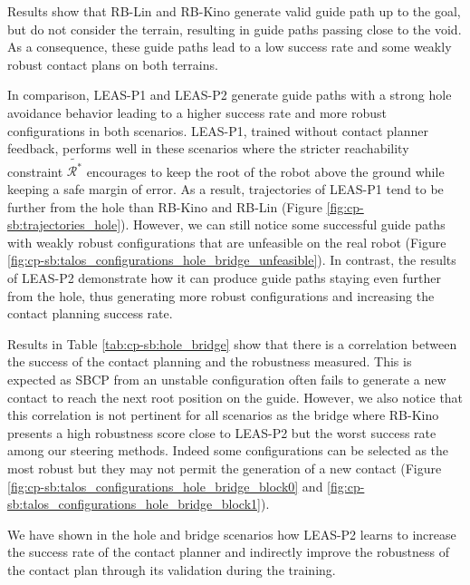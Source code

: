 Results show that RB-Lin and RB-Kino generate valid guide path up to the goal, but do not consider the terrain, resulting in guide paths passing close to the void. As a consequence, these guide paths lead to a low success rate and some weakly robust contact plans on both terrains.

In comparison, LEAS-P1 and LEAS-P2 generate guide paths with a strong hole avoidance behavior leading to a higher success rate and more robust configurations in both scenarios.
LEAS-P1, trained without contact planner feedback, performs well in these scenarios where the stricter reachability constraint $\tilde{\mathcal{R}^*}$ encourages to keep the root of the robot above the ground while keeping a safe margin of error. 
As a result, trajectories of LEAS-P1 tend to be further from the hole than RB-Kino and RB-Lin (Figure \ref{fig:cp-sb:trajectories_hole}). 
However, we can still notice some successful guide paths with weakly robust configurations that are unfeasible on the real robot (Figure \ref{fig:cp-sb:talos_configurations_hole_bridge_unfeasible}).
In contrast, the results of LEAS-P2 demonstrate how it can produce guide paths staying even further from the hole, thus generating more robust configurations and increasing the contact planning success rate.

Results in Table \ref{tab:cp-sb:hole_bridge} show that there is a correlation between the success of the contact planning and the robustness measured. This is expected as SBCP from an unstable configuration often fails to generate a new contact to reach the next root position on the guide.
However, we also notice that this correlation is not pertinent for all scenarios as the bridge where RB-Kino presents a high robustness score close to LEAS-P2 but the worst success rate among our steering methods. 
Indeed some configurations can be selected as the most robust but they may not permit the generation of a new contact (Figure \ref{fig:cp-sb:talos_configurations_hole_bridge_block0} and \ref{fig:cp-sb:talos_configurations_hole_bridge_block1}).

We have shown in the hole and bridge scenarios how LEAS-P2 learns to increase the success rate of the contact planner and indirectly improve the robustness of the contact plan through its validation during the training.

